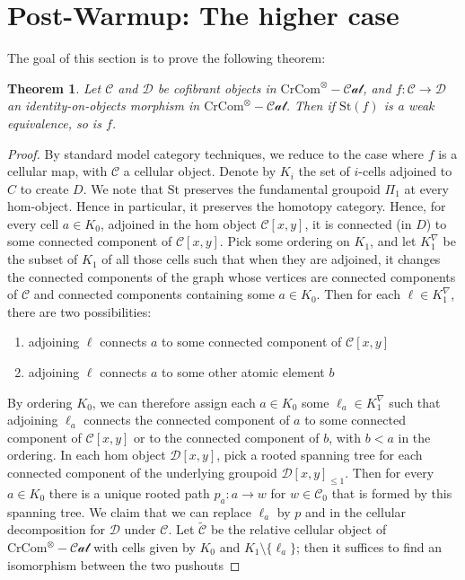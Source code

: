 \documentclass[12pt]{article}
\newtheorem{theorem}{Theorem}[section]
\theoremstyle{definition}
\newcommand{\C}{\mathcal{C}}
\newcommand{\D}{\mathcal{D}}
\newcommand{\crcom}{\text{CrCom}}
\newcommand{\tensorcrossedcat}{\crcom^\otimes-\mathcal{Cat}}
\newcommand{\st}{\text{St}}
\begin{document}
\section{Post-Warmup: The higher case}
	The goal of this section is to prove the following theorem:
	\begin{theorem}
		Let $\C$ and $\D$ be cofibrant objects in $\tensorcrossedcat$, and $f: \C \to \D$ an identity-on-objects morphism in $\tensorcrossedcat$. 
		Then if $\st(f)$ is a weak equivalence, so is $f$.
	\end{theorem}
	\begin{proof}
		By standard model category techniques, we reduce to the case where $f$ is a cellular map, with $\C$ a cellular object. 
		Denote by $K_i$ the set of $i$-cells adjoined to $C$ to create $D$.
		We note that $\st$ preserves the fundamental groupoid $\Pi_1$ at every hom-object. 
		Hence in particular, it preserves the homotopy category. 
		Hence, for every cell $a \in K_0$, adjoined in the hom object $\C[x,y]$, it is connected (in $D$) to some connected component of $\C[x,y]$. 
		Pick some ordering on $K_1$, and let $K_1^\nabla$ be the subset of $K_1$ of all those cells such that when they are adjoined, it changes the connected components of the graph whose vertices are connected components of $\C$ and connected components containing some $a \in K_0$.
		Then for each $\ell \in K_1^\nabla$, there are two possibilities:
		\begin{enumerate}
			\item adjoining $\ell$ connects $a$ to some connected component of $\C[x,y]$
			\item adjoining $\ell$ connects $a$ to some other atomic element $b$ 
		\end{enumerate}
		By ordering $K_0$, we can therefore assign each $a \in K_0$ some $\ell_a \in K_1^\nabla$ such that adjoining $\ell_a$ connects the connected component of $a$ to some connected component of $\C[x,y]$ or to the connected component of $b$, with $b < a$ in the ordering.
		In each hom object $\D[x,y]$, pick a rooted spanning tree for each connected component of the underlying groupoid $\D[x,y]_{\le 1}$. 
		Then for every $a \in K_0$ there is a unique rooted path $p_a: a \to w$ for $w \in \C_0$ that is formed by this spanning tree. 
		We claim that we can replace $\ell_a$ by $p$ and in the cellular decomposition for $\D$ under $\C$. 
		Let $\tilde{\C}$ be the relative cellular object of $\tensorcrossedcat$ with cells given by $K_0$ and $K_1 \setminus \{\ell_a\}$; then it suffices to find an isomorphism between the two pushouts

\end{proof}
\end{document}
